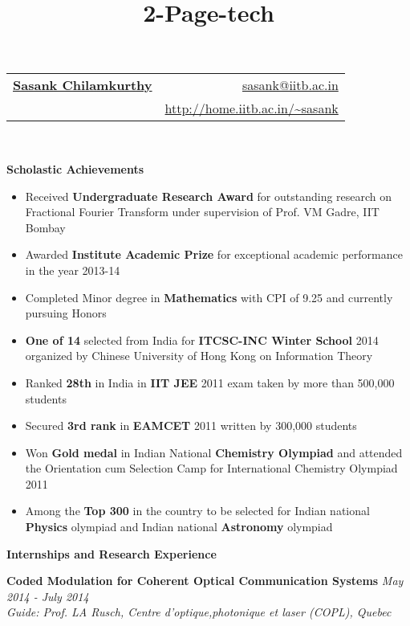 \documentclass[a4paper,10pt]{article}
\title{2-Page-tech}
\newcommand{\resheading}[1]{
	{\large \colorbox{mygrey}{\begin{minipage}{\textwidth}{\textbf{#1 \vphantom{p\^{E}}}}\end{minipage}}}
}
\newcommand{\ressubheadingWithGuide}[3]{%

	\textbf{#1} \hfill \textit{#2}\null\\
	\textit{\small #3} %
	\vspace{-4pt}
}
\begin{document}
\newcommand{\mywebheader}{
\begin{tabular*}{7in}{l@{\extracolsep{\fill}}r}
	\textbf{\href{http://www.home.iitb.ac.in/~sasank}{\LARGE Sasank Chilamkurthy}} & \href{mailto:sasank@iitb.ac.in}{sasank@iitb.ac.in}\\
	 & \href{http://home.iitb.ac.in/~sasank}{http://home.iitb.ac.in/\textasciitilde sasank} \\
	\end{tabular*}
\\
\vspace{0.1in}}

\mywebheader

\resheading{Scholastic Achievements} 
	\begin{itemize}\itemsep -1pt
    	\item Received \textbf{Undergraduate Research Award} for outstanding research on Fractional Fourier Transform under supervision of Prof. VM Gadre, IIT Bombay
		\item Awarded \textbf{Institute Academic Prize} for exceptional academic performance in the year 2013-14
        \item Completed Minor degree in \textbf{Mathematics} with CPI of 9.25 and currently pursuing Honors
		\item \textbf{One of 14} selected from India for \textbf{ITCSC-INC Winter School} 2014 organized by Chinese University of Hong Kong on Information Theory
		\item Ranked \textbf{28th} in India in \textbf{IIT JEE} 2011 exam taken by more than 500,000 students
		\item Secured \textbf{3rd rank} in \textbf{EAMCET} 2011 written by 300,000 students
		\item Won \textbf{Gold medal} in Indian National \textbf{Chemistry Olympiad} and attended the Orientation cum Selection Camp for International Chemistry Olympiad 2011
		\item Among the \textbf{Top 300} in the country to be selected for Indian national \textbf{Physics} olympiad and Indian national \textbf{Astronomy} olympiad 
    \end{itemize}
\resheading{Internships and Research Experience}
        	\ressubheadingWithGuide{Coded Modulation for Coherent Optical Communication Systems}{\textit{May 2014 - July 2014}}{Guide: Prof. LA Rusch, Centre d'optique,photonique et laser (COPL), Quebec}
\end{document}
